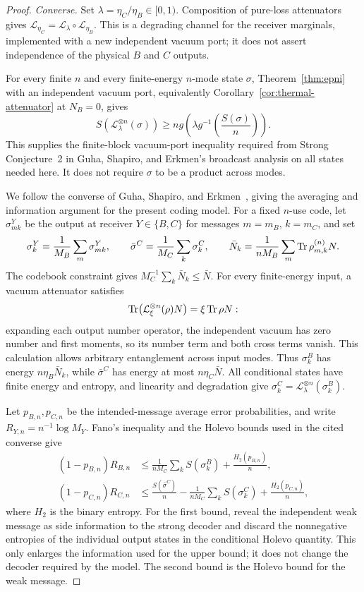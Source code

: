 \begin{proof}
\emph{Converse.}
Set \(\lambda=\eta_C/\eta_B\in[0,1)\). Composition of pure-loss
attenuators gives
\(\mathcal L_{\eta_C}=\mathcal L_\lambda\circ\mathcal L_{\eta_B}\).
This is a degrading channel for the receiver marginals, implemented
with a new independent vacuum port; it does not assert independence
of the physical \(B\) and \(C\) outputs.

For every finite \(n\) and every finite-energy \(n\)-mode state
\(\sigma\), Theorem~\ref{thm:epni} with an independent vacuum port,
equivalently Corollary~\ref{cor:thermal-attenuator} at \(N_B=0\), gives
\begin{equation}\label{eq:broadcast-vacuum-bound}
 S\!\left(\mathcal L_\lambda^{\otimes n}(\sigma)\right)
 \ge n g\!\left(\lambda g^{-1}\!\left(\frac{S(\sigma)}n\right)\right).
\end{equation}
This supplies the finite-block vacuum-port inequality required from
Strong Conjecture~2 in Guha, Shapiro, and Erkmen's broadcast analysis
\cite[Appendix~A]{GSE2007} on all states needed here. It does not
require \(\sigma\) to be a product across modes.

We follow the converse of Guha, Shapiro, and Erkmen~\cite{GSE2007},
giving the averaging and information argument for the present coding
model. For a fixed \(n\)-use code, let \(\sigma_{mk}^Y\) be the output
at receiver \(Y\in\{B,C\}\) for messages \(m=m_B\), \(k=m_C\), and set
\[
 \sigma_k^Y=\frac1{M_B}\sum_m\sigma_{mk}^Y,\qquad
 \bar\sigma^C=\frac1{M_C}\sum_k\sigma_k^C,\qquad
 \bar N_k=\frac1{nM_B}\sum_m\operatorname{Tr}\rho_{m,k}^{(n)}N.
\]
The codebook constraint gives \(M_C^{-1}\sum_k\bar N_k\le\bar N\).
For every finite-energy input, a vacuum attenuator satisfies
\[
 \operatorname{Tr}\bigl(\mathcal L_\xi^{\otimes n}(\rho)N\bigr)=\xi\operatorname{Tr}\rho N:
\]
expanding each output number operator, the independent vacuum has zero
number and first moments, so its number term and both cross terms vanish.
This calculation allows arbitrary entanglement across input modes.
Thus \(\sigma_k^B\) has energy \(n\eta_B\bar N_k\), while
\(\bar\sigma^C\) has energy at most \(n\eta_C\bar N\). All conditional
states have finite energy and entropy, and linearity and degradation give
\(\sigma_k^C=\mathcal L_\lambda^{\otimes n}(\sigma_k^B)\).

Let \(p_{B,n},p_{C,n}\) be the intended-message average error
probabilities, and write \(R_{Y,n}=n^{-1}\log M_Y\). Fano's inequality
and the Holevo bounds used in the cited converse give
\[
\begin{aligned}
 (1-p_{B,n})R_{B,n}
 &\le \frac1{nM_C}\sum_kS(\sigma_k^B)+\frac{H_2(p_{B,n})}{n},\\
 (1-p_{C,n})R_{C,n}
 &\le \frac{S(\bar\sigma^C)}n-\frac1{nM_C}\sum_kS(\sigma_k^C)
       +\frac{H_2(p_{C,n})}{n},
\end{aligned}
\]
where \(H_2\) is the binary entropy. For the first bound, reveal the
independent weak message as side information to the strong decoder and
discard the nonnegative entropies of the individual output states in the
conditional Holevo quantity. This only enlarges the information used for
the upper bound; it does not change the decoder required by the model.
The second bound is the Holevo bound for the weak message.


\end{proof}
